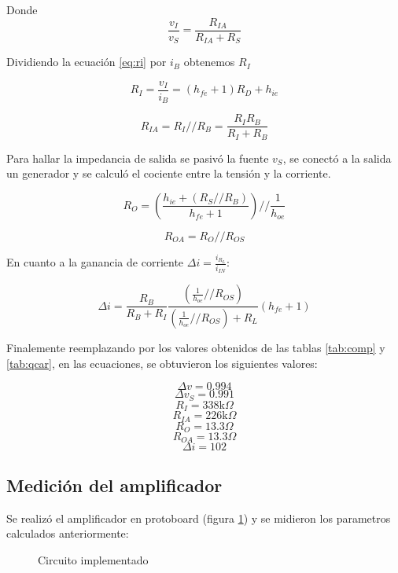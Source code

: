\documentclass[../../main.tex]{subfiles}
\begin{document}
Donde
\begin{equation}
\frac{v_I}{v_S} = \frac{R_{IA}}{R_{IA}+R_S}
\end{equation}

Dividiendo la ecuación \ref{eq:ri} por $i_B$ obtenemos $R_I$

\begin{equation}
R_I=\frac{v_I}{i_B} = \left( h_{fe} +1 \right) R_D + h_{ie}
\end{equation}

\begin{equation}
R_{IA}= R_I // R_B=\frac{R_I R_B}{R_I + R_B}
\end{equation}

Para hallar la impedancia de salida se pasiv\'o la fuente $v_S$, se conectó a la salida un generador y se calculó el cociente entre la tensión y la corriente.

\begin{equation}
R_O=\left( \frac{h_{ie} + \left( R_S // R_B \right)}{h_{fe}+1} \right) // \frac{1}{h_{oe}}
\end{equation}

\begin{equation}
R_{OA}=R_O // R_{OS}
\end{equation}

En cuanto a la ganancia de corriente $\Delta i=\frac{i_{R_L}}{i_{IN}}$:

\begin{equation}
\Delta i=\frac{R_B}{R_B +R_I} \frac{\left(  \frac{1}{h_{oe}} // R_{OS} \right)}{\left(  \frac{1}{h_{oe}} // R_{OS} \right) + R_L} (h_{fe} +1)
\end{equation}

Finalemente reemplazando por los valores obtenidos de las tablas \ref{tab:comp} y \ref{tab:qcar}, en las ecuaciones, se obtuvieron los siguientes valores:

$$\Delta v = 0.994$$
$$ \Delta v_S =0.991 $$
$$ R_I=338\mathrm{k}\Omega $$
$$ R_{IA} = 226\mathrm{k}\Omega $$
$$ R_O=13.3 \Omega $$
$$R_{OA}=13.3\Omega $$
$$\Delta i= 102 $$

\subsection{Medición del amplificador}
Se realizó el amplificador en protoboard (figura \ref{fig:pro}) y se midieron los parametros calculados anteriormente:

\begin{figure}[H]	
	\centering
	\caption{Circuito implementado}\label{fig:pro}
\end{figure}
\end{document}
